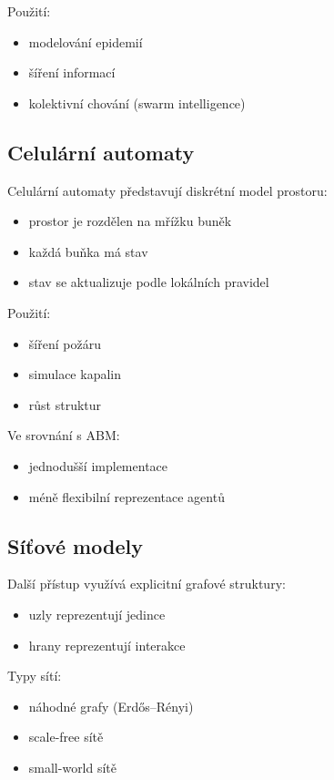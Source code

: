 Použití:
\begin{itemize}
\item modelování epidemií
\item šíření informací
\item kolektivní chování (swarm intelligence)
\end{itemize}

\subsection{Celulární automaty}

Celulární automaty představují diskrétní model prostoru:

\begin{itemize}
\item prostor je rozdělen na mřížku buněk
\item každá buňka má stav
\item stav se aktualizuje podle lokálních pravidel
\end{itemize}

Použití:
\begin{itemize}
\item šíření požáru
\item simulace kapalin
\item růst struktur
\end{itemize}

Ve srovnání s ABM:
\begin{itemize}
\item jednodušší implementace
\item méně flexibilní reprezentace agentů
\end{itemize}

\subsection{Síťové modely}

Další přístup využívá explicitní grafové struktury:

\begin{itemize}
\item uzly reprezentují jedince
\item hrany reprezentují interakce
\end{itemize}

Typy sítí:
\begin{itemize}
\item náhodné grafy (Erdős--Rényi)
\item scale-free sítě
\item small-world sítě
\end{itemize}

